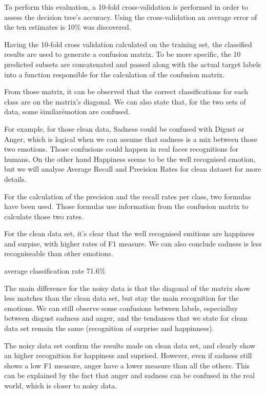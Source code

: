 To perform this evaluation, a 10-fold cross-validation is performed in order to assess the decision tree’s accuracy.
Using the cross-validation an average error of the ten estimates is 10\% was discovered.

Having the 10-fold cross validation calculated on the training set, the classified results
are used to generate a confusion matrix.
To be more specific, the 10 predicted subsets are concatenated
and passed along with the actual target labels into a function responsible for the calculation of the confusion matrix.

From those matrix, it can be observed that the correct classifications for each class are on the matrix’s diagonal.
We can also state that, for the two sets of data, some \"similar\" emotion are confused.



For example, for those clean data, Sadness could be confused with Digust or Anger, which is logical when we can assume that sadness is a mix between those two emotions. 
Those confusions could happen in real faces recognitions for humans.
On the other hand Happiness seems to be the well recognised emotion, but we will
analyse Average Recall and Precision Rates for clean dataset for more details. 




For the calculation of the precision and the recall rates per class, two formulas have been used.
Those formulas use information from the confusion matrix to calculate those two rates.

For the clean data set, it's clear that the well recognised emitions are happiness and surpise, with higher rates of F1 measure. 
We can also conclude sadness is less recogniseable than other emotions.


average classification rate
71.6\%
 


The main difference for the noisy data is that the diagonal of the matrix show less matches than the clean data set, but stay the main recognition for the emotions.
We can still observe some confusions between labels, especialluy between disgust sadness and anger, and the tendances that we state for clean data set remain the same (recognition of surprise and happinness).




The noisy data set confirm the results made on clean data set, and clearly show an higher recognition for happiness and suprised. However, even if sadness still shows a low F1 measure, anger have a lower measure than all the others. This can be explained by the fact that anger and sadness can be confused in the real world, which is closer to noisy data. 


